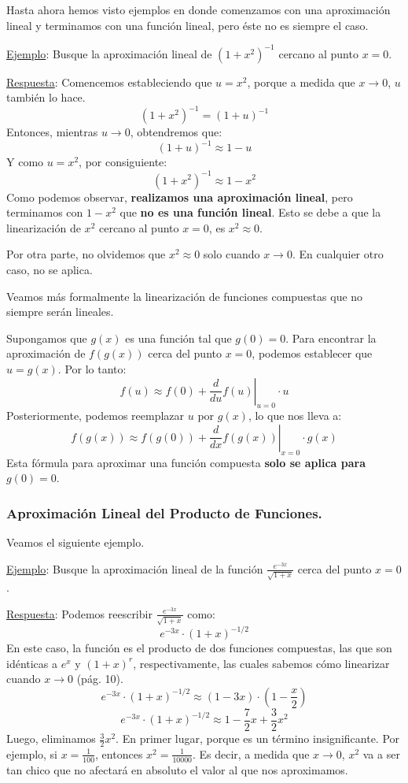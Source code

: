 \documentclass[12pt]{article}
\begin{document}
Hasta ahora hemos visto ejemplos en donde comenzamos con una aproximación lineal y terminamos con una función lineal, pero éste no es siempre el caso.

\underline{Ejemplo}: Busque la aproximación lineal de $(1 + x^{2})^{-1}$ cercano al punto $x = 0$.

\underline{Respuesta}: Comencemos estableciendo que $u = x^{2}$, porque a medida que $x \to 0$, $u$ también lo hace.
\[(1 + x^{2})^{-1} = (1 + u)^{-1}\]
Entonces, mientras $u \to 0$, obtendremos que:
\[(1 + u)^{-1} \approx 1 - u\]
Y como $u = x^{2}$, por consiguiente:
\[(1 + x^{2})^{-1} \approx 1 - x^{2}\]
Como podemos observar, \textbf{realizamos una aproximación lineal}, pero terminamos con $1 - x^{2}$ que \textbf{no es una función lineal}. Esto se debe a que la linearización de $x^{2}$ cercano al punto $x = 0$, es $x^{2} \approx 0$.

Por otra parte, no olvidemos que $x^{2} \approx 0$ solo cuando $x \to 0$. En cualquier otro caso, no se aplica.

Veamos más formalmente la linearización de funciones compuestas que no siempre serán lineales.

Supongamos que $g(x)$ es una función tal que $g(0) = 0$. Para encontrar la aproximación de $f(g(x))$ cerca del punto $x = 0$, podemos establecer que $u = g(x)$. Por lo tanto:
\[f(u) \approx f(0) + \left. \frac{d}{du} f(u) \right|_{u = 0} \cdot u\]
Posteriormente, podemos reemplazar $u$ por $g(x)$, lo que nos lleva a:
\[f(g(x)) \approx f(g(0)) + \left. \frac{d}{dx} f(g(x)) \right|_{x = 0} \cdot g(x)\]
Esta fórmula para aproximar una función compuesta \textbf{solo se aplica para $g(0) = 0$}.

\newpage

\subsubsection{Aproximación Lineal del Producto de Funciones.}

Veamos el siguiente ejemplo.

\underline{Ejemplo}: Busque la aproximación lineal de la función $\frac{e^{-3x}}{\sqrt{1 + x}}$ cerca del punto $x = 0$.

\underline{Respuesta}: Podemos reescribir $\frac{e^{-3x}}{\sqrt{1 + x}}$ como:
\[e^{-3x} \cdot (1 + x)^{-1/2}\]
En este caso, la función es el producto de dos funciones compuestas, las que son idénticas a $e^{x}$ y $(1 + x)^{r}$, respectivamente, las cuales sabemos cómo linearizar cuando $x \to 0$ (pág. 10).
\[e^{-3x} \cdot (1 + x)^{-1/2} \approx (1 - 3x) \cdot \left(1 - \frac{x}{2}\right)\]
\[e^{-3x} \cdot (1 + x)^{-1/2} \approx 1 - \frac{7}{2}x + \frac{3}{2}x^{2}\]
Luego, eliminamos $\frac{3}{2}x^{2}$. En primer lugar, porque es un término insignificante. Por ejemplo, si $x = \frac{1}{100}$, entonces $x^{2} = \frac{1}{10000}$. Es decir, a medida que $x \to 0$, $x^2$ va a ser tan chico que no afectará en absoluto el valor al que nos aproximamos.
\end{document}
